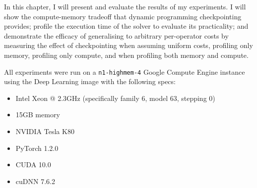 In this chapter, I will present and evaluate the results of my experiments.
I will show the compute-memory tradeoff that dynamic programming checkpointing provides; profile the execution time of the solver to evaluate its practicality; and demonstrate the efficacy of generalising to arbitrary per-operator costs by measuring the effect of checkpointing when assuming uniform costs, profiling only memory, profiling only compute, and when profiling both memory and compute.

All experiments were run on a \texttt{n1-highmem-4} Google Compute Engine instance using the Deep Learning image with the following specs:
\begin{itemize}[topsep=0.2em]
    \item Intel Xeon @ 2.3GHz (specifically family 6, model 63, stepping 0)
    \item 15GB memory
    \item NVIDIA Tesla K80
    \item PyTorch 1.2.0
    \item CUDA 10.0
    \item cuDNN 7.6.2
\end{itemize}
